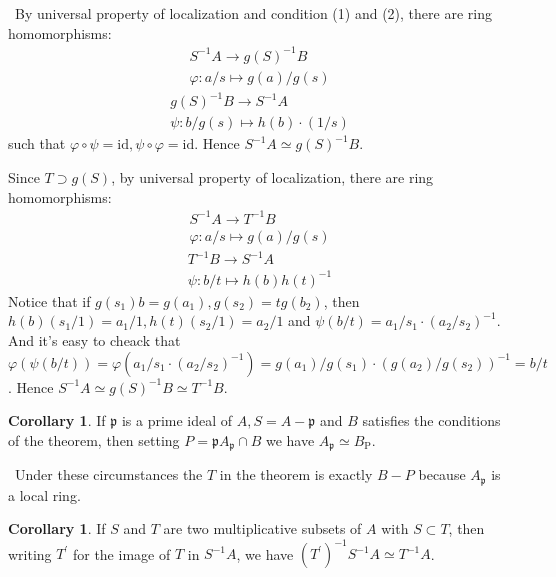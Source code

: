 \documentclass[a4paper,12pt]{article}
\newenvironment{prooff}{{\noindent\it\textcolor{cyan!40!black}{Proof}:}\,}{\par}
\newcommand{\p}{^{\prime}}
\theoremstyle{definition}
\newtheorem{coro}[defn]{Corollary}
\begin{document}
\begin{prooff}
    By universal property of localization and condition (1) and (2), there are ring homomorphisms:
    \begin{align*}
        S^{-1}A\rightarrow g(S)^{-1}B \\
        \varphi:  a/s\mapsto g(a)/g(s)
    \end{align*}
    \begin{align*}
        g(S)^{-1}B\rightarrow S^{-1}A \\
        \psi: b/g(s)\mapsto h(b) \cdot  (1/s)
    \end{align*}
    such that $\varphi\circ\psi=\text{id}, \psi\circ\varphi=\text{id}$.
    Hence $S^{-1}A\simeq g(S)^{-1}B$.

    Since $T\supset g(S)$, by universal property of localization, there are ring homomorphisms:
    \begin{align*}
        S^{-1}A\rightarrow T^{-1}B \\
        \varphi:  a/s\mapsto g(a)/g(s)
    \end{align*}
    \begin{align*}
        T^{-1}B\rightarrow S^{-1}A \\
        \psi: b/t\mapsto h(b)h(t)^{-1}
    \end{align*}
    Notice that if $g(s_1)b=g(a_1),g(s_2)=tg(b_2)$, then $h(b)(s_1/1)=a_1/1,h(t)(s_2/1)=a_2/1$ and $\psi(b/t)=a_1/s_1\cdot (a_2/s_2)^{-1}$. And it's easy to cheack that
    $\varphi(\psi(b/t))=\varphi(a_1/s_1\cdot (a_2/s_2)^{-1})=g(a_1)/g(s_1)\cdot (g(a_2)/g(s_2))^{-1}=b/t$. Hence $S^{-1}A\simeq g(S)^{-1}B\simeq T^{-1}B$.

\end{prooff}
\begin{coro}
    If $\mathfrak{p}$ is a prime ideal of $A, S=A-\mathfrak{p}$ and $B$ satisfies the conditions of the theorem, then setting $P=\mathfrak{p} A_{\mathfrak{p}} \cap B$ we have $A_{\mathfrak{p}}\simeq B_{\mathrm{P}}$.
\end{coro}
\begin{prooff}
    Under these circumstances the $T$ in the theorem is exactly $B-P$ because $A_{\mathfrak{p}}$ is a local ring.
\end{prooff}
\begin{coro}
    If $S$ and $T$ are two multiplicative subsets of $A$ with $S \subset T$, then writing $T^{\prime}$ for the image of $T$ in $S^{-1}A$, we have $(T\p)^{-1}S^{-1}A\simeq T^{-1}A$.
\end{coro}
\end{document}
